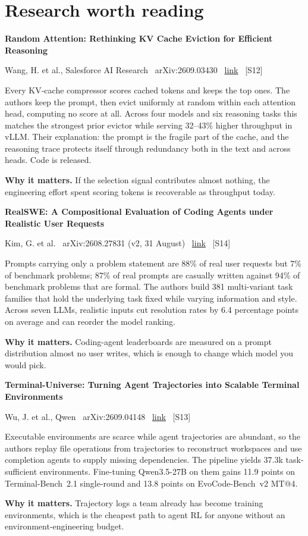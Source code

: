 \documentclass[11pt,a4paper]{article}
\newcommand{\entry}[4]{%
  \par\vspace{0.7em}%
  {\sffamily\bfseries\color{brandink}#1}\par
  {\footnotesize\color{brandgrey}#2 \textbullet\ \href{#3}{link} \textbullet\ \srcref{#4}}\par
  \vspace{0.15em}}
\newcommand{\why}[1]{\par{\small\textbf{Why it matters.} #1}\par}
\newcommand{\srcref}[1]{\textcolor{brandaccent}{[S#1]}}
\begin{document}
\section{Research worth reading}

\entry{Random Attention: Rethinking KV Cache Eviction for Efficient Reasoning}{Wang, H. et al., Salesforce AI Research \textbullet\ arXiv:2609.03430}{https://arxiv.org/abs/2609.03430}{12}
Every KV-cache compressor scores cached tokens and keeps the top ones. The authors keep the
prompt, then evict uniformly at random within each attention head, computing no score at
all. Across four models and six reasoning tasks this matches the strongest prior evictor
while serving 32--43\% higher throughput in vLLM. Their explanation: the prompt is the
fragile part of the cache, and the reasoning trace protects itself through redundancy both
in the text and across heads. Code is released.
\why{If the selection signal contributes almost nothing, the engineering effort spent
scoring tokens is recoverable as throughput today.}

\entry{RealSWE: A Compositional Evaluation of Coding Agents under Realistic User Requests}{Kim, G. et al. \textbullet\ arXiv:2608.27831 (v2, 31 August)}{https://arxiv.org/abs/2608.27831}{14}
Prompts carrying only a problem statement are 88\% of real user requests but 7\% of
benchmark problems; 87\% of real prompts are casually written against 94\% of benchmark
problems that are formal. The authors build 381 multi-variant task families that hold the
underlying task fixed while varying information and style. Across seven LLMs, realistic
inputs cut resolution rates by 6.4 percentage points on average and can reorder the model
ranking.
\why{Coding-agent leaderboards are measured on a prompt distribution almost no user
writes, which is enough to change which model you would pick.}

\entry{Terminal-Universe: Turning Agent Trajectories into Scalable Terminal Environments}{Wu, J. et al., Qwen \textbullet\ arXiv:2609.04148}{https://arxiv.org/abs/2609.04148}{13}
Executable environments are scarce while agent trajectories are abundant, so the authors
replay file operations from trajectories to reconstruct workspaces and use completion
agents to supply missing dependencies. The pipeline yields 37.3k task-sufficient
environments. Fine-tuning Qwen3.5-27B on them gains 11.9 points on Terminal-Bench~2.1
single-round and 13.8 points on EvoCode-Bench~v2 MT@4.
\why{Trajectory logs a team already has become training environments, which is the
cheapest path to agent RL for anyone without an environment-engineering budget.}
\end{document}

